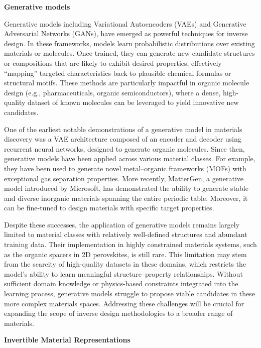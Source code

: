 \textbf{Generative models}

Generative models including Variational Autoencoders (VAEs) and Generative Adversarial Networks (GANs), have emerged as powerful techniques for inverse design\cite{RN412, RN633, RN347, RN614, RN70}. In these frameworks, models learn probabilistic distributions over existing materials or molecules. Once trained, they can generate new candidate structures or compositions that are likely to exhibit desired properties, effectively “mapping” targeted characteristics back to plausible chemical formulas or structural motifs. These methods are particularly impactful in organic molecule design (e.g., pharmaceuticals, organic semiconductors), where a dense, high-quality dataset of known molecules can be leveraged to yield innovative new candidates. 

One of the earliest notable demonstrations of a generative model in materials discovery was a VAE architecture composed of an encoder and decoder using recurrent neural networks, designed to generate organic molecules\cite{RN411}. Since then, generative models have been applied across various material classes. For example, they have been used to generate novel metal–organic frameworks (MOFs) with exceptional gas separation properties\cite{RN412}. More recently, MatterGen, a generative model introduced by Microsoft, has demonstrated the ability to generate stable and diverse inorganic materials spanning the entire periodic table. Moreover, it can be fine-tuned to design materials with specific target properties\cite{RN633}. 

Despite these successes, the application of generative models remains largely limited to material classes with relatively well-defined structures and abundant training data. Their implementation in highly constrained materials systems, such as the organic spacers in 2D perovskites, is still rare. This limitation may stem from the scarcity of high-quality datasets in these domains, which restricts the model’s ability to learn meaningful structure–property relationships. Without sufficient domain knowledge or physics-based constraints integrated into the learning process, generative models struggle to propose viable candidates in these more complex materials spaces. Addressing these challenges will be crucial for expanding the scope of inverse design methodologies to a broader range of materials.

\textbf{Invertible Material Representations}

